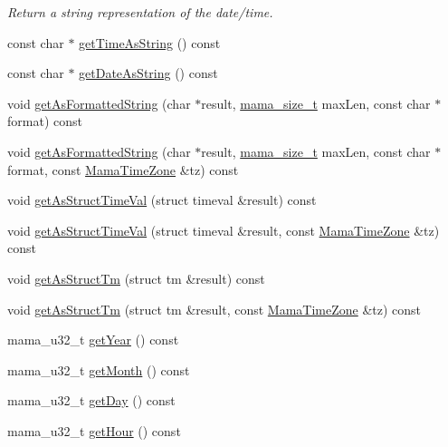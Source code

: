 \begin{DoxyCompactItemize}
\begin{DoxyCompactList}\small\item\em Return a string representation of the date/time. \item\end{DoxyCompactList}\item 
const char $\ast$ \hyperlink{classWombat_1_1MamaDateTime_a6f48574bcc00a4cab6753a7a91d78743}{getTimeAsString} () const 
\item 
const char $\ast$ \hyperlink{classWombat_1_1MamaDateTime_abacd2e3cbcf824f61437099138197c9a}{getDateAsString} () const 
\item 
void \hyperlink{classWombat_1_1MamaDateTime_ad6ee818253f878732d2cd487e44fe962}{getAsFormattedString} (char $\ast$result, \hyperlink{classmama__size__t}{mama\_\-size\_\-t} maxLen, const char $\ast$format) const 
\item 
void \hyperlink{classWombat_1_1MamaDateTime_acfed61cbe6e7701ef883049693b6b0ae}{getAsFormattedString} (char $\ast$result, \hyperlink{classmama__size__t}{mama\_\-size\_\-t} maxLen, const char $\ast$format, const \hyperlink{classWombat_1_1MamaTimeZone}{MamaTimeZone} \&tz) const 
\item 
void \hyperlink{classWombat_1_1MamaDateTime_af6c5fd2056ed4cab413d4e7c6edbac48}{getAsStructTimeVal} (struct timeval \&result) const 
\item 
void \hyperlink{classWombat_1_1MamaDateTime_a62a9ee319c5e3f776a9865665fc70a3c}{getAsStructTimeVal} (struct timeval \&result, const \hyperlink{classWombat_1_1MamaTimeZone}{MamaTimeZone} \&tz) const 
\item 
void \hyperlink{classWombat_1_1MamaDateTime_a22e09625b13d3c551ebca057e8afa6b5}{getAsStructTm} (struct tm \&result) const 
\item 
void \hyperlink{classWombat_1_1MamaDateTime_a4178844d857c831ead19d48df4d6ce4b}{getAsStructTm} (struct tm \&result, const \hyperlink{classWombat_1_1MamaTimeZone}{MamaTimeZone} \&tz) const 
\item 
mama\_\-u32\_\-t \hyperlink{classWombat_1_1MamaDateTime_a431664f839454a265a15125940b8fdca}{getYear} () const 
\item 
mama\_\-u32\_\-t \hyperlink{classWombat_1_1MamaDateTime_abeb22c4a6074de90c3cdd741e98cb2b0}{getMonth} () const 
\item 
mama\_\-u32\_\-t \hyperlink{classWombat_1_1MamaDateTime_afe315dd02d8b4ced3d802a1bdc4ab22d}{getDay} () const 
\item 
mama\_\-u32\_\-t \hyperlink{classWombat_1_1MamaDateTime_add3164a27491279196e84304da904386}{getHour} () const 

\end{DoxyCompactItemize}
